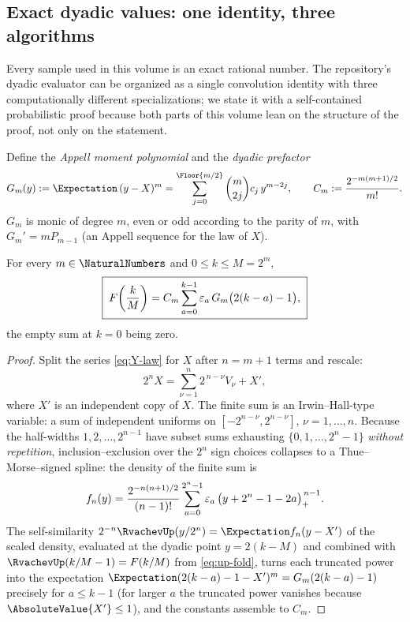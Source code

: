 \subsection{Exact dyadic values: one identity, three algorithms}
\label{sec:dyadic-values}

Every sample used in this volume is an exact rational number.  The
repository's dyadic evaluator can be organized as a single convolution
identity with three computationally different specializations; we state
it with a self-contained probabilistic proof because both parts of this
volume lean on the structure of the proof, not only on the statement.

Define the \emph{Appell moment polynomial} and the \emph{dyadic
prefactor}
\begin{equation}
 G_m(y):=\Expectation\,(y-X)^m
 =\sum_{j=0}^{\Floor{m/2}}\binom m{2j}c_j\,y^{m-2j},
 \qquad
 C_m:=\frac{2^{-m(m+1)/2}}{m!}.
 \label{eq:Pm-Cm}
\end{equation}
$G_m$ is monic of degree $m$, even or odd according to the parity of
$m$, with $G_m'=mP_{m-1}$ (an Appell sequence for the law of $X$).

\begin{theorem}
\label{thm:dyadic-values}
For every $m\in\NaturalNumbers$ and $0\le k\le M=2^m$,
\begin{equation}
 \boxed{\;
 F\!\left(\frac{k}{M}\right)
 =C_m\sum_{a=0}^{k-1}\varepsilon_a\,G_m\bigl(2(k-a)-1\bigr),
 \;}
 \label{eq:dyadic-convolution}
\end{equation}
the empty sum at $k=0$ being zero.
\end{theorem}

\begin{proof}
Split the series \eqref{eq:Y-law} for $X$ after $n=m+1$ terms and
rescale:
\[
 2^{n}X=\sum_{\nu=1}^{n}2^{\,n-\nu}V_\nu+X',
\]
where $X'$ is an independent copy of $X$.  The finite sum is an
Irwin--Hall-type variable: a sum of independent uniforms on
$[-2^{n-\nu},2^{n-\nu}]$, $\nu=1,\dots,n$.  Because the half-widths
$1,2,\dots,2^{n-1}$ have subset sums exhausting
$\{0,1,\dots,2^{n}-1\}$ \emph{without repetition}, inclusion--exclusion
over the $2^n$ sign choices collapses to a Thue--Morse--signed spline:
the density of the finite sum is
\[
 f_n(y)=\frac{2^{-n(n+1)/2}}{(n-1)!}
 \sum_{a=0}^{2^{n}-1}\varepsilon_a\,
 \bigl(y+2^{n}-1-2a\bigr)_+^{\,n-1}.
\]
The self-similarity $2^{-n}\RvachevUp(y/2^{n})=\Expectation f_n(y-X')$ of the scaled
density, evaluated at the dyadic point $y=2(k-M)$ and combined with
$\RvachevUp(k/M-1)=F(k/M)$ from \eqref{eq:up-fold}, turns each truncated power
into the expectation $\Expectation(2(k-a)-1-X')^{m}=G_m(2(k-a)-1)$ precisely for
$a\le k-1$ (for larger $a$ the truncated power vanishes because
$\AbsoluteValue{X'}\le1$), and the constants assemble to $C_m$.
\end{proof}

